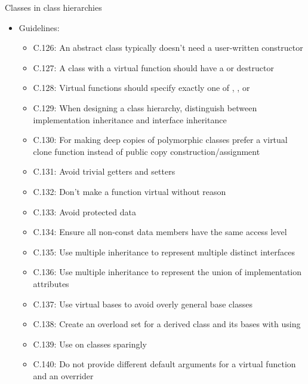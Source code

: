 \begin{frame}[t]{Classes in class hierarchies}
\begin{itemize}
  \item Guidelines:
    \begin{itemize}\fontsize{8pt}{8pt}\selectfont
      \item C.126: An abstract class typically doesn’t need a user-written constructor
      \item C.127: A class with a virtual function should have a  or  destructor
      \item C.128: Virtual functions should specify exactly one of , , 
            or 
      \item C.129: When designing a class hierarchy, distinguish between implementation inheritance and interface inheritance
      \item C.130: For making deep copies of polymorphic classes prefer a virtual clone function instead of public copy construction/assignment
      \item C.131: Avoid trivial getters and setters
      \item C.132: Don’t make a function virtual without reason
      \item C.133: Avoid protected data
      \item C.134: Ensure all non-const data members have the same access level
      \item C.135: Use multiple inheritance to represent multiple distinct interfaces
      \item C.136: Use multiple inheritance to represent the union of implementation attributes
      \item C.137: Use virtual bases to avoid overly general base classes
      \item C.138: Create an overload set for a derived class and its bases with using
      \item C.139: Use  on classes sparingly
      \item C.140: Do not provide different default arguments for a virtual function and an overrider
    \end{itemize}
\end{itemize}
\end{frame}

